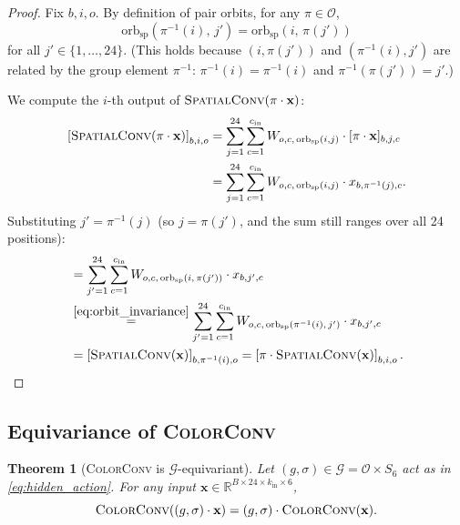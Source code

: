 \documentclass[11pt]{article}
\newtheorem{theorem}{Theorem}[section]
\newcommand{\bx}{\mathbf{x}}
\newcommand{\orbsp}{\mathrm{orb}_{\mathrm{sp}}}
\newcommand{\R}{\mathbb{R}}
\begin{document}
\begin{proof}
Fix $b, i, o$.
By definition of pair orbits, for any $\pi \in \mathcal{O}$,
\begin{equation}
  \orbsp\!\left(\pi^{-1}(i),\, j'\right)
  = \orbsp\!\left(i,\, \pi(j')\right)
  \label{eq:orbit_invariance}
\end{equation}
for all $j' \in \{1,\ldots,24\}$.
(This holds because $(i, \pi(j'))$ and $(\pi^{-1}(i), j')$ are related by
the group element $\pi^{-1}$: $\pi^{-1}(i) = \pi^{-1}(i)$ and
$\pi^{-1}(\pi(j')) = j'$.)

We compute the $i$-th output of $\textsc{SpatialConv}(\pi \cdot \bx)$:
\begin{align}
  \left[\textsc{SpatialConv}(\pi \cdot \bx)\right]_{b,i,o}
  &= \sum_{j=1}^{24} \sum_{c=1}^{c_{\mathrm{in}}}
     W_{o,c,\,\orbsp(i,j)} \cdot [\pi \cdot \bx]_{b,j,c} \notag \\
  &= \sum_{j=1}^{24} \sum_{c=1}^{c_{\mathrm{in}}}
     W_{o,c,\,\orbsp(i,j)} \cdot x_{b,\pi^{-1}(j),c}.
\end{align}
Substituting $j' = \pi^{-1}(j)$ (so $j = \pi(j')$, and the sum still
ranges over all 24 positions):
\begin{align}
  &= \sum_{j'=1}^{24} \sum_{c=1}^{c_{\mathrm{in}}}
     W_{o,c,\,\orbsp(i,\,\pi(j'))} \cdot x_{b,j',c} \notag \\
  &\overset{\eqref{eq:orbit_invariance}}{=}
     \sum_{j'=1}^{24} \sum_{c=1}^{c_{\mathrm{in}}}
     W_{o,c,\,\orbsp(\pi^{-1}(i),\,j')} \cdot x_{b,j',c} \notag \\
  &= \left[\textsc{SpatialConv}(\bx)\right]_{b,\pi^{-1}(i),o}
   = \left[\pi \cdot \textsc{SpatialConv}(\bx)\right]_{b,i,o}. \qedhere
\end{align}
\end{proof}

\subsection{Equivariance of \textsc{ColorConv}}

\begin{theorem}[\textsc{ColorConv} is $\mathcal{G}$-equivariant]
\label{thm:colorconv}
Let $(g, \sigma) \in \mathcal{G} = \mathcal{O} \times S_6$ act as in
\eqref{eq:hidden_action}.
For any input $\bx \in \R^{B \times 24 \times k_{\mathrm{in}} \times 6}$,
\begin{equation}
  \textsc{ColorConv}\!\left((g,\sigma) \cdot \bx\right)
  = (g,\sigma) \cdot \textsc{ColorConv}(\bx).
\end{equation}
\end{theorem}
\end{document}
